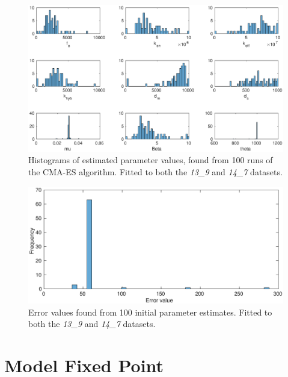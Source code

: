 \documentclass[10pt,journal]{./IEEE_latex_class/IEEEtran}
\begin{document}
\clearpage

\begin{figure}[H]
   \centering
        \includegraphics[scale = 0.4]{13_9_14_7_hist}
        \caption{Histograms of estimated parameter values, found from 100 runs of the CMA-ES algorithm. Fitted to both the  \textit{13\_9} and \textit{14\_7} datasets.}
        \label{}
\end{figure}

\begin{figure}[H]
   \centering
        \includegraphics[scale = 0.3]{13_9_14_7_f_hist}
        \caption{Error values found from 100 initial parameter estimates. Fitted to both the  \textit{13\_9} and \textit{14\_7} datasets.}
        \label{}
\end{figure}

\clearpage

\section{Model Fixed Point}
\label{ModelFixedPoint}
\setcounter{figure}{0} 
 
\end{document}
